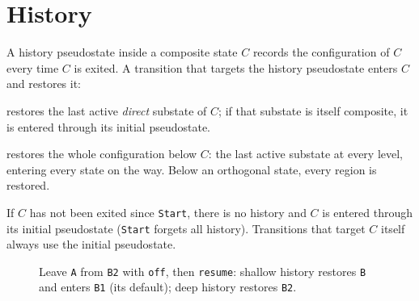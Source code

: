 \documentclass[11pt,a4paper,openany]{report}
\newcommand{\code}[1]{\texttt{#1}}
\begin{document}
\section{History}
\label{sec:history}
A history pseudostate inside a composite state $C$ records the configuration of $C$ every time $C$ is
exited. A transition that targets the history pseudostate enters $C$ and restores it:
\begin{description}[style=nextline, itemsep=1pt]
  \item[Shallow history (H)] restores the last active \emph{direct} substate of $C$; if that substate is
    itself composite, it is entered through its initial pseudostate.
  \item[Deep history (H*)] restores the whole configuration below $C$: the last active substate at
    every level, entering every state on the way. Below an orthogonal state, every region is
    restored.
\end{description}
If $C$ has not been exited since \code{Start}, there is no history and $C$ is entered through its
initial pseudostate (\code{Start} forgets all history). Transitions that target $C$ itself always use
the initial pseudostate.

\begin{figure}[H]
\centering
{}
\caption{Leave \code{A} from \code{B2} with \code{off}, then \code{resume}: shallow history restores
\code{B} and enters \code{B1} (its default); deep history restores \code{B2}.}
\end{figure}
\end{document}
